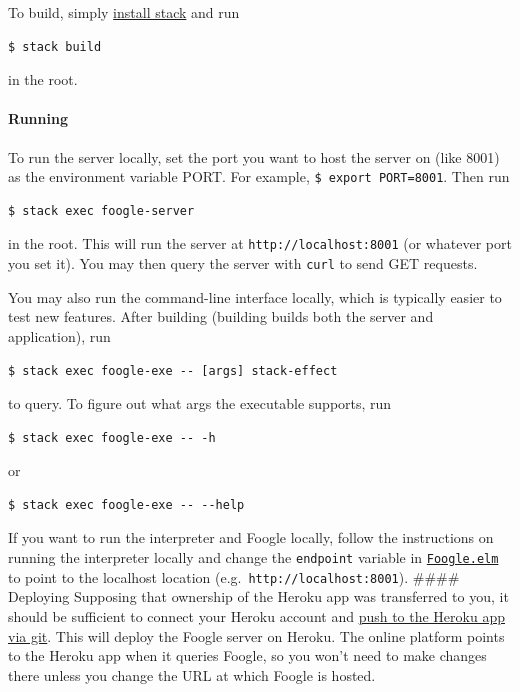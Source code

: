 \documentclass[
]{article}
\begin{document}
To build, simply
\href{https://docs.haskellstack.org/en/stable/install_and_upgrade/}{install
stack} and run

\begin{verbatim}
$ stack build
\end{verbatim}

in the root.

\hypertarget{running}{%
\paragraph{Running}\label{running}}

To run the server locally, set the port you want to host the server on
(like 8001) as the environment variable PORT. For example,
\texttt{\$\ export\ PORT=8001}. Then run

\begin{verbatim}
$ stack exec foogle-server
\end{verbatim}

in the root. This will run the server at \texttt{http://localhost:8001}
(or whatever port you set it). You may then query the server with
\texttt{curl} to send GET requests.

You may also run the command-line interface locally, which is typically
easier to test new features. After building (building builds both the
server and application), run

\begin{verbatim}
$ stack exec foogle-exe -- [args] stack-effect
\end{verbatim}

to query. To figure out what args the executable supports, run

\begin{verbatim}
$ stack exec foogle-exe -- -h
\end{verbatim}

or

\begin{verbatim}
$ stack exec foogle-exe -- --help
\end{verbatim}

If you want to run the interpreter and Foogle locally, follow the
instructions on running the interpreter locally and change the
\texttt{endpoint} variable in
\href{https://github.com/factor-hmc/simple-interpreter/blob/master/src/Foogle.elm}{\texttt{Foogle.elm}}
to point to the localhost location
(e.g.~\texttt{http://localhost:8001}). \#\#\#\# Deploying Supposing that
ownership of the Heroku app was transferred to you, it should be
sufficient to connect your Heroku account and
\href{https://devcenter.heroku.com/articles/git}{push to the Heroku app
via git}. This will deploy the Foogle server on Heroku. The online
platform points to the Heroku app when it queries Foogle, so you won't
need to make changes there unless you change the URL at which Foogle is
hosted.
\end{document}

